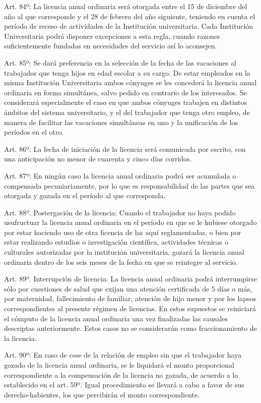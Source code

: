 \documentclass[]{article}
\begin{document}
Art. 84º: La licencia anual ordinaria será otorgada entre el 15 de
diciembre del año al que corresponde y el 28 de febrero del año
siguiente, teniendo en cuenta el período de receso de actividades de la
Institución universitaria. Cada Institución Universitaria podrá disponer
excepciones a esta regla, cuando razones suficientemente fundadas en
necesidades del servicio así lo aconsejen.

Art. 85º: Se dará preferencia en la selección de la fecha de las
vacaciones al trabajador que tenga hijos en edad escolar a su cargo. De
estar empleados en la misma Institución Universitaria ambos cónyuges se
les concederá la licencia anual ordinaria en forma simultánea, salvo
pedido en contrario de los interesados. Se considerará especialmente el
caso en que ambos cónyuges trabajen en distintos ámbitos del sistema
universitario, y el del trabajador que tenga otro empleo, de manera de
facilitar las vacaciones simultáneas en uno y la unificación de los
períodos en el otro.

Art. 86º: La fecha de iniciación de la licencia será comunicada por
escrito, con una anticipación no menor de cuarenta y cinco días
corridos.

Art. 87º: En ningún caso la licencia anual ordinaria podrá ser acumulada
o compensada pecuniariamente, por lo que es responsabilidad de las
partes que sea otorgada y gozada en el período al que corresponda.

Art. 88º. Postergación de la licencia: Cuando el trabajador no haya
podido usufructuar la licencia anual ordinaria en el período en que se
le hubiese otorgado por estar haciendo uso de otra licencia de las aquí
reglamentadas, o bien por estar realizando estudios o investigación
científica, actividades técnicas o culturales autorizadas por la
institución universitaria, gozará la licencia anual ordinaria dentro de
los seis meses de la fecha en que se reintegre al servicio.

Art. 89º. Interrupción de licencia: La licencia anual ordinaria podrá
interrumpirse sólo por cuestiones de salud que exijan una atención
certificada de 5 días o más, por maternidad, fallecimiento de familiar,
atención de hijo menor y por los lapsos correspondientes al presente
régimen de licencias. En estos supuestos se reiniciará el cómputo de la
licencia anual ordinaria una vez finalizadas las causales descriptas
anteriormente. Estos casos no se considerarán como fraccionamiento de la
licencia.

Art. 90º: En caso de cese de la relación de empleo sin que el trabajador
haya gozado de la licencia anual ordinaria, se le liquidará el monto
proporcional correspondiente a la compensación de la licencia no gozada,
de acuerdo a lo establecido en el art. 59º. Igual procedimiento se
llevará a cabo a favor de sus derecho-habientes, los que percibirán el
monto correspondiente.
\end{document}
